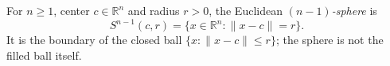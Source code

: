 
For $n\ge1$, center $c\in\mathbb R^n$ and radius $r>0$, the Euclidean \emph{$(n-1)$-sphere} is
\[
S^{n-1}(c,r)=\{x\in\mathbb R^n:\|x-c\|=r\}.
\]
It is the boundary of the closed ball $\{x:\|x-c\|\le r\}$; the sphere is not the filled ball itself.
